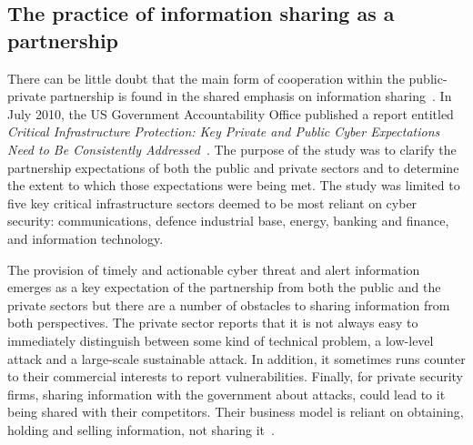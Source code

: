 \documentclass[a4paper,11pt]{article}
\begin{document}
\subsection{The practice of information sharing as a partnership}

There can be little doubt that the main form of cooperation within the
public-private partnership is found in the shared emphasis on
information sharing~\cite{dunncavelty+suter:2009}. In July 2010, the
US Government Accountability Office published a report entitled
{\emph{Critical Infrastructure Protection: Key Private and Public
Cyber Expectations Need to Be Consistently
Addressed}}~\cite{usgao:2010}. The purpose of the study was to clarify
the partnership expectations of both the public and private sectors
and to determine the extent to which those expectations were being
met. The study was limited to five key critical infrastructure sectors
deemed to be most reliant on cyber security: communications, defence
industrial base, energy, banking and finance, and information
technology.

The provision of timely and actionable cyber threat and alert
information emerges as a key expectation of the partnership from both
the public and the private sectors but there are a number of obstacles
to sharing information from both perspectives.  The private sector
reports that it is not always easy to immediately distinguish between
some kind of technical problem, a low-level attack and a large-scale
sustainable attack.  In addition, it sometimes runs counter to their
commercial interests to report vulnerabilities. Finally, for private
security firms, sharing information with the government about attacks,
could lead to it being shared with their competitors. Their business
model is reliant on obtaining, holding and selling information, not
sharing it~\cite{usgao:2010}.
\end{document}
